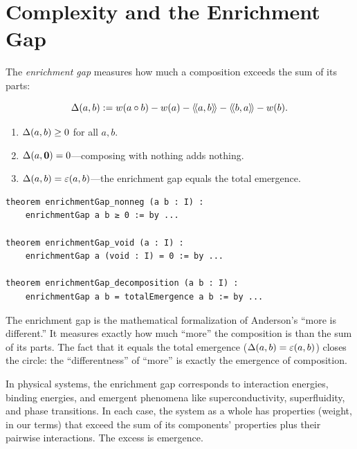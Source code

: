 \section{Complexity and the Enrichment Gap}

The \emph{enrichment gap} measures how much a composition exceeds the sum of its
parts:

\begin{definition}
\[
  \Delta(a,b) := w(a \circ b) - w(a) - \langle\!\langle a, b \rangle\!\rangle - \langle\!\langle b, a \rangle\!\rangle - w(b).
\]
\end{definition}

\begin{theorem}
\label{thm:enrichment-gap-nature}
\begin{enumerate}
  \item $\Delta(a,b) \geq 0$ for all $a, b$.
  \item $\Delta(a,\mathbf{0}) = 0$---composing with nothing adds nothing.
  \item $\Delta(a,b) = \varepsilon(a,b)$---the enrichment gap equals the
    total emergence.
\end{enumerate}
\end{theorem}

\begin{lstlisting}[caption={Enrichment gap (IDT\_v3\_Emergence.lean)}]
theorem enrichmentGap_nonneg (a b : I) :
    enrichmentGap a b ≥ 0 := by ...

theorem enrichmentGap_void (a : I) :
    enrichmentGap a (void : I) = 0 := by ...

theorem enrichmentGap_decomposition (a b : I) :
    enrichmentGap a b = totalEmergence a b := by ...
\end{lstlisting}

\begin{interpretation}
The enrichment gap is the mathematical formalization of Anderson's ``more is
different.'' It measures exactly how much ``more'' the composition is than the
sum of its parts. The fact that it equals the total emergence ($\Delta(a,b) =
\varepsilon(a,b)$) closes the circle: the ``differentness'' of ``more'' is exactly
the emergence of composition.

In physical systems, the enrichment gap corresponds to interaction energies,
binding energies, and emergent phenomena like superconductivity, superfluidity,
and phase transitions. In each case, the system as a whole has properties
(weight, in our terms) that exceed the sum of its components' properties plus
their pairwise interactions. The excess is emergence.
\end{interpretation}


